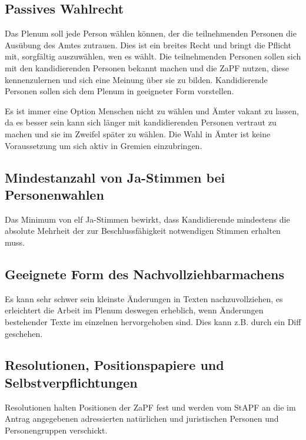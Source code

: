 \documentclass[12pt,oneside]{scrartcl}
\begin{document}
\subsection{Passives Wahlrecht%
  \label{passives-wahlrecht}%
}

Das Plenum soll jede Person wählen können, der die teilnehmenden Personen die
Ausübung des Amtes zutrauen. Dies ist ein breites Recht und bringt die Pflicht
mit, sorgfältig auszuwählen, wen es wählt. Die teilnehmenden Personen sollen
sich mit den kandidierenden Personen bekannt machen und die ZaPF nutzen, diese
kennenzulernen und sich eine Meinung über sie zu bilden. Kandidierende Personen
sollen sich dem Plenum in geeigneter Form vorstellen.

Es ist immer eine Option Menschen nicht zu wählen und Ämter vakant zu lassen, da
es besser sein kann sich länger mit kandidierenden Personen vertraut zu machen
und sie im Zweifel später zu wählen. Die Wahl in Ämter ist keine Voraussetzung
um sich aktiv in Gremien einzubringen.


\subsection{Mindestanzahl von Ja-Stimmen bei Personenwahlen%
  \label{mindestanzahl-von-ja-stimmen-bei-personenwahlen}%
}

Das Minimum von elf Ja-Stimmen bewirkt, dass Kandidierende
mindestens die absolute Mehrheit der zur Beschlussfähigkeit notwendigen Stimmen
erhalten muss.


\subsection{Geeignete Form des Nachvollziehbarmachens%
  \label{geeignete-form-des-nachvollziehbarmachens}%
}

Es kann sehr schwer sein kleinste Änderungen in Texten nachzuvollziehen, es
erleichtert die Arbeit im Plenum deswegen erheblich, wenn Änderungen bestehender
Texte im einzelnen hervorgehoben sind. Dies kann z.B. durch ein Diff geschehen.


\subsection{Resolutionen, Positionspapiere und Selbstverpflichtungen%
  \label{resolutionen-positionspapiere-und-selbstverpflichtungen}%
}

Resolutionen halten Positionen der ZaPF fest und werden vom StAPF an die im
Antrag angegebenen adressierten natürlichen und juristischen Personen und
Personengruppen verschickt.
\end{document}
